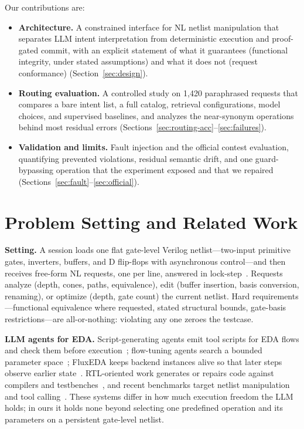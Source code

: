 \documentclass[conference,letterpaper]{IEEEtran}
\begin{document}
Our contributions are:
\begin{itemize}
\item \textbf{Architecture.} A constrained interface for NL netlist
  manipulation that separates LLM intent interpretation from deterministic
  execution and proof-gated commit, with an explicit statement of what it
  guarantees (functional integrity, under stated assumptions) and what it does
  not (request conformance) (Section~\ref{sec:design}).
\item \textbf{Routing evaluation.} A controlled study on 1,420 paraphrased
  requests that compares a bare intent list, a full catalog, retrieval
  configurations, model choices, and supervised baselines, and analyzes the
  near-synonym operations behind most residual errors
  (Sections~\ref{sec:routing-acc}--\ref{sec:failures}).
\item \textbf{Validation and limits.} Fault injection and the official contest
  evaluation, quantifying prevented violations, residual semantic drift, and
  one guard-bypassing operation that the experiment exposed and that we
  repaired (Sections~\ref{sec:fault}--\ref{sec:official}).
\end{itemize}

\section{Problem Setting and Related Work}
\label{sec:related}

\textbf{Setting.} A session loads one flat gate-level Verilog netlist---two-input
primitive gates, inverters, buffers, and D flip-flops with asynchronous
control---and then receives free-form NL requests, one per line, answered in
lock-step~\cite{problema}. Requests analyze (depth, cones, paths, equivalence),
edit (buffer insertion, basis conversion, renaming), or optimize (depth, gate
count) the current netlist. Hard requirements---functional equivalence where
requested, stated structural bounds, gate-basis restrictions---are
all-or-nothing: violating any one zeroes the testcase.

\textbf{LLM agents for EDA.} Script-generating agents emit tool scripts for EDA
flows and check them before execution~\cite{chateda,jarvis,openroadagent};
flow-tuning agents search a bounded parameter space~\cite{orfsagent,statetune};
FluxEDA keeps backend instances alive so that later steps observe earlier
state~\cite{fluxeda}. RTL-oriented work generates or repairs code against
compilers and testbenches~\cite{rtlfixer,verilogeval,rtllm}, and recent
benchmarks target netlist manipulation and tool
calling~\cite{netlistbench,mcpbench}. These systems differ in how much
execution freedom the LLM holds; in ours it holds none beyond selecting one
predefined operation and its parameters on a persistent gate-level netlist.
\end{document}
